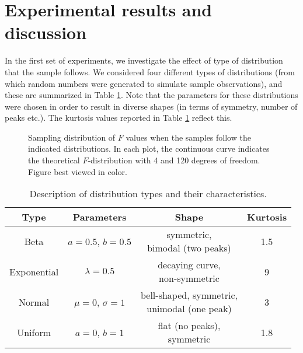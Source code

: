 \documentclass[10pt,final,Twcolumn]{IEEEtran}
\begin{document}
\section{Experimental results and discussion} \label{experiments}

In the first set of experiments, we investigate the effect of type of distribution that the sample follows. We considered four different types of distributions (from which random numbers were generated to simulate sample observations), and these are summarized in Table \ref{table1}. Note that the parameters for these distributions were chosen in order to result in diverse shapes (in terms of symmetry, number of peaks etc.). The kurtosis values reported in Table \ref{table1} reflect this. 

\begin{figure*} [h]
\centering
\hfil
{}
\hfil
{}
\hfil
{}
\caption{Sampling distribution of $F$ values when the samples follow the indicated distributions. In each plot, the continuous curve indicates the theoretical $F$-distribution with 4 and 120 degrees of freedom. Figure best viewed in color.}
\label{sampling distribution of F}
\end{figure*}


\begin{table} 
\caption{Description of distribution types and their characteristics.}
\label{table1}

\begin{tabular}{|c||c| |c| |c| }
\hline
Type  & Parameters & Shape & Kurtosis\\
\hline
Beta & \shortstack{$a=0.5$,\\$b=0.5$} & \shortstack{symmetric, \\bimodal (two peaks)}& 1.5  \\
\hline
Exponential & $\lambda=0.5$ & \shortstack{decaying curve, \\non-symmetric} & 9 \\
\hline
Normal & \shortstack{$\mu=0$,\\$\sigma=1$} & \shortstack{bell-shaped, symmetric, \\ unimodal (one peak)}   & 3 \\
\hline
Uniform & \shortstack{$a=0$,\\$b=1$} & \shortstack{flat (no peaks), \\symmetric} & 1.8 \\
\hline
\end{tabular}
\end{table}
\end{document}
